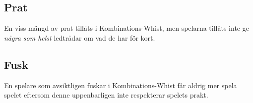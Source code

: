 \documentclass[a4paper]{article}
\begin{document}
		\subsection{Prat}
			En viss mängd av prat tillåts i Kombinations-Whist, men spelarna tillåts inte ge \emph{några som helst} ledtrådar om vad de har för kort.
		
		\subsection{Fusk}
			En spelare som avsiktligen fuskar i Kombinations-Whist får aldrig mer spela spelet eftersom denne uppenbarligen inte respekterar spelets prakt.

	\pagebreak
	
	
\end{document}
